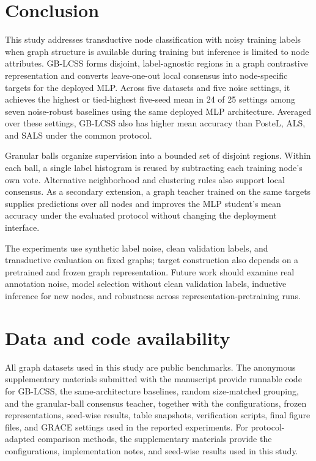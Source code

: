 \documentclass[10pt,letterpaper]{elsarticle}
\begin{document}
\FloatBarrier

\section{Conclusion}\label{sec:7}

This study addresses transductive node classification with noisy training labels when graph structure is available during training but inference is limited to node attributes. GB-LCSS forms disjoint, label-agnostic regions in a graph contrastive representation and converts leave-one-out local consensus into node-specific targets for the deployed MLP. Across five datasets and five noise settings, it achieves the highest or tied-highest five-seed mean in 24 of 25 settings among seven noise-robust baselines using the same deployed MLP architecture. Averaged over these settings, GB-LCSS also has higher mean accuracy than PosteL, ALS, and SALS under the common protocol.

Granular balls organize supervision into a bounded set of disjoint regions. Within each ball, a single label histogram is reused by subtracting each training node's own vote. Alternative neighborhood and clustering rules also support local consensus. As a secondary extension, a graph teacher trained on the same targets supplies predictions over all nodes and improves the MLP student's mean accuracy under the evaluated protocol without changing the deployment interface.

The experiments use synthetic label noise, clean validation labels, and transductive evaluation on fixed graphs; target construction also depends on a pretrained and frozen graph representation. Future work should examine real annotation noise, model selection without clean validation labels, inductive inference for new nodes, and robustness across representation-pretraining runs.

\FloatBarrier

\section{Data and code availability}\label{sec:8}

All graph datasets used in this study are public benchmarks. The anonymous supplementary materials submitted with the manuscript provide runnable code for GB-LCSS, the same-architecture baselines, random size-matched grouping, and the granular-ball consensus teacher, together with the configurations, frozen representations, seed-wise results, table snapshots, verification scripts, final figure files, and GRACE settings used in the reported experiments. For protocol-adapted comparison methods, the supplementary materials provide the configurations, implementation notes, and seed-wise results used in this study.
\end{document}
